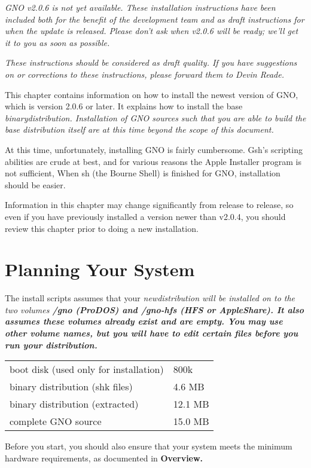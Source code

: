 \documentclass{report}
\begin{document}
\em GNO v2.0.6 is not yet available.  These installation instructions
have been included both for the benefit of the development team and as
draft instructions for when the update is released.  Please don't ask
when v2.0.6 will be ready; we'll get it to you as soon as possible.\rm

\em These instructions should be considered as draft quality.  If you
have suggestions on or corrections to these instructions, please forward
them to Devin Reade.\rm

This chapter contains information on how to install the newest version
of GNO, which is version 2.0.6 or later.  It explains how to install
the base \em binary\rm distribution.  Installation of GNO sources such that
you are able to \em build \rm the base distribution itself are at this
time beyond the scope of this document.

At this time, unfortunately, installing GNO is fairly cumbersome.
Gsh's scripting abilities are crude at best, and for various reasons
the Apple Installer program is not sufficient,
When sh (the Bourne Shell) is finished for GNO, installation should be easier.

Information in this chapter may change
significantly from release to release, so even if you have previously
installed a version newer than v2.0.4, you should review this chapter
prior to doing a new installation.

\section{Planning Your System}

The install scripts assumes that your \em new\rm distribution will be installed
on to the two volumes \bf /gno \rm (ProDOS) and \bf /gno-hfs \rm (HFS 
or AppleShare).
It also assumes these volumes already exist and are \em empty\rm.
You may use other volume names,
but you will have to edit certain files before you run your distribution.

\begin{tabular}{ll}
boot disk (used only for installation)	& 800k \\
binary distribution (shk files)		& 4.6 MB \\
binary distribution (extracted)		& 12.1 MB \\
complete GNO source			& 15.0 MB \\
\end{tabular}

Before you start, you should also ensure that your system meets the
minimum hardware requirements, as documented in \bf Overview\rm.
\end{document}
